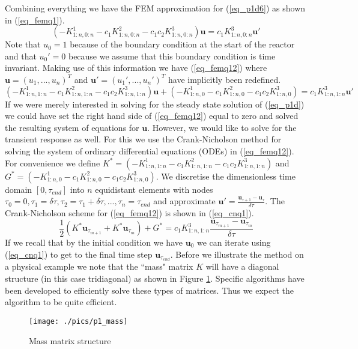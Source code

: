 \documentclass[11pt,fleqn]{article}
\theoremstyle{defstyle}
\begin{document}
Combining everything we have the FEM approximation for (\ref{eq_p1d6}) as shown in (\ref{eq_femq1}). 
\begin{equation}
\left(-K^1_{1:n,0:n}-c_1K^2_{1:n,0:n}-c_1c_2K^3_{1:n,0:n} \right)\mathbf{u} =  c_1K^3_{1:n,0:n}\mathbf{u}\prime
\label{eq_femq1}
\end{equation}
Note that $u_0=1$ because of the boundary condition at the start of the reactor and that $u_0\prime=0$ because we assume that this boundary condition is time invariant. Making use of this information we have (\ref{eq_femq12}) where $\mathbf{u}=\left(u_1,...,u_n\right)^T$ and $\mathbf{u}\prime=\left(u_1\prime,...,u_n\prime \right)^T$ have implicitly been redefined.
\begin{equation}
\left(-K^1_{1:n,1:n}-c_1K^2_{1:n,1:n}-c_1c_2K^3_{1:n,1:n} \right)\mathbf{u} +\left(-K^1_{1:n,0}-c_1K^2_{1:n,0} -c_1c_2K^3_{1:n,0}\right) =  c_1K^3_{1:n,1:n}\mathbf{u}\prime
\label{eq_femq12}
\end{equation}
If we were merely interested in solving for the steady state solution of (\ref{eq_p1d}) we could have set the right hand side of (\ref{eq_femq12}) equal to zero and solved the resulting system of equations for $\mathbf{u}$. However, we would like to solve for the transient response as well. For this we use the Crank-Nicholson method for solving the system of ordinary differential equations (ODEs) in (\ref{eq_femq12}). For convenience we define $K^* = \left(-K^1_{1:n,1:n}-c_1K^2_{1:n,1:n}-c_1c_2K^3_{1:n,1:n} \right)$ and $G^{*} = \left(-K^1_{1:n,0}-c_1K^2_{1:n,0} -c_1c_2K^3_{1:n,0}\right)$. We discretise the dimensionless time domain $[0,\tau_{end}]$ into $n$ equidistant elements with nodes $\tau_0 = 0, \tau_1=\delta \tau, \tau_2=\tau_1 + \delta \tau,...,\tau_n=\tau_{end}$ and approximate $\mathbf{u}\prime = \frac{\mathbf{u}_{\tau+1} -\mathbf{u}_{\tau}}{\delta \tau}$. The Crank-Nicholson scheme for (\ref{eq_femq12}) is shown in (\ref{eq_cnq1}).
\begin{equation}
\frac{1}{2}\left( K^*\mathbf{u}_{\tau_{m+1}} + K^*\mathbf{u}_{\tau_m} \right) + G^* = c_1K^3_{1:n,1:n}\frac{\mathbf{u}_{\tau_{m+1}} -\mathbf{u}_{\tau_{m}}}{\delta \tau}
\label{eq_cnq1}
\end{equation} 
If we recall that by the initial condition we have $\mathbf{u}_0$ we can iterate using (\ref{eq_cnq1}) to get to the final time step $\mathbf{u}_{\tau_{end}}$. Before we illustrate the method on a physical example we note that the ``mass" matrix $K$ will have a diagonal structure (in this case tridiagonal) as shown in Figure \ref{fig_p1mass}. Specific algorithms have been developed to efficiently solve these types of matrices. Thus we expect the algorithm to be quite efficient. 
\begin{figure}[H] 
\centering
\texttt{[image: ./pics/p1\_mass]}
\caption{Mass matrix structure} 
\label{fig_p1mass}
\end{figure}
\end{document}
